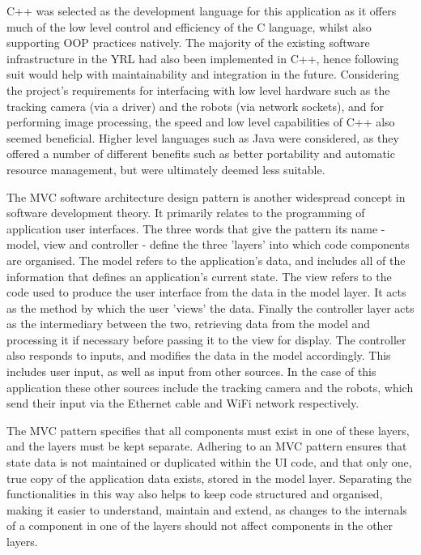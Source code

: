 C++ was selected as the development language for this application as it offers much of the low level control and efficiency of the C language, whilst also supporting OOP practices natively. The majority of the existing software infrastructure in the YRL had also been implemented in C++, hence following suit would help with maintainability and integration in the future. Considering the project's requirements for interfacing with low level hardware such as the tracking camera (via a driver) and the robots (via network sockets), and for performing image processing, the speed and low level capabilities of C++ also seemed beneficial. Higher level languages such as Java were considered, as they offered a number of different benefits such as better portability and automatic resource management, but were ultimately deemed less suitable.

The MVC \cite{MVC} software architecture design pattern is another widespread concept in software development theory. It primarily relates to the programming of application user interfaces. The three words that give the pattern its name - model, view and controller - define the three 'layers' into which code components are organised. The model refers to the application's data, and includes all of the information that defines an application's current state. The view refers to the code used to produce the user interface from the data in the model layer. It acts as the method by which the user 'views' the data. Finally the controller layer acts as the intermediary between the two, retrieving data from the model and processing it if necessary before passing it to the view for display. The controller also responds to inputs, and modifies the data in the model accordingly. This includes user input, as well as input from other sources. In the case of this application these other sources include the tracking camera and the robots, which send their input via the Ethernet cable and WiFi network respectively. 

The MVC pattern specifies that all components must exist in one of these layers, and the layers must be kept separate. Adhering to an MVC pattern ensures that state data is not maintained or duplicated within the UI code, and that only one, true copy of the application data exists, stored in the model layer. Separating the functionalities in this way also helps to keep code structured and organised, making it easier to understand, maintain and extend, as changes to the internals of a component in one of the layers should not affect components in the other layers.

